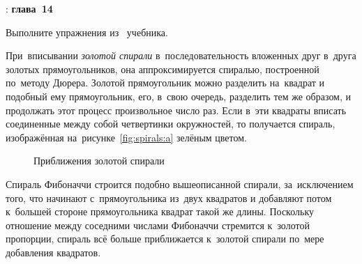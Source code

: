 \WhatToReadSection
\textcite{Stroustrup:2016:ru}: \textbf{глава~14}



\ExercisesSection
\begin{exercise}
\item Выполните упражнения из~ учебника.

\item При~вписывании \emph{золотой спирали} в~последовательность вложенных друг в~друга золотых прямоугольников, она аппроксимируется спиралью, построенной по~методу Дюрера. Золотой прямоугольник можно разделить на~квадрат и подобный ему прямоугольник, его, в~свою очередь, разделить тем же образом, и продолжать этот процесс произвольное число раз. Если в~эти квадраты вписать соединенные между собой четвертинки окружностей, то получается спираль, изображённая на~рисунке~\ref{fig:spirals:a} зелёным цветом.

\medskip

\begin{figure}[ht]
    {\centering
        \hfill
        \hfill
        \hfill
    }
    \caption{Приближения золотой спирали}
    \label{fig:spirals}
\end{figure}

Спираль Фибоначчи строится подобно вышеописанной спирали, за~исключением того, что начинают с~прямоугольника из~двух квадратов и добавляют потом к~большей стороне прямоугольника квадрат такой же длины. Поскольку отношение между соседними числами Фибоначчи стремится к~золотой пропорции, спираль всё больше приближается к~золотой спирали по~мере добавления квадратов.


\end{exercise}
